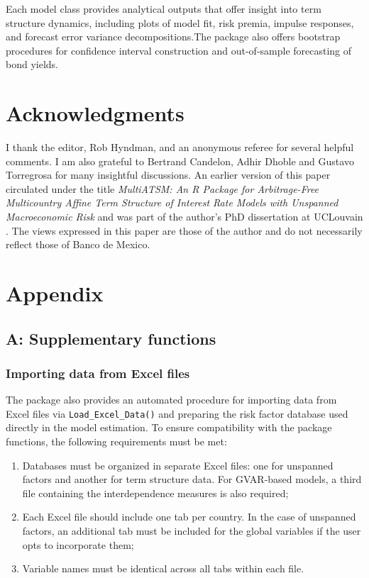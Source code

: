 Each model class provides analytical outputs that offer insight into term structure dynamics, including plots of model fit, risk premia, impulse responses, and forecast error variance decompositions.The  package also offers bootstrap procedures for confidence interval construction and out-of-sample forecasting of bond yields.

\section*{Acknowledgments}\label{acknowledgments}

I thank the editor, Rob Hyndman, and an anonymous referee for several helpful comments. I am also grateful to Bertrand Candelon, Adhir Dhoble and Gustavo Torregrosa for many insightful discussions. An earlier version of this paper circulated under the title \emph{MultiATSM: An R Package for Arbitrage-Free Multicountry Affine Term Structure of Interest Rate Models with Unspanned Macroeconomic Risk} and was part of the author's PhD dissertation at UCLouvain \citep{Moura2022}. The views expressed in this paper are those of the author and do not necessarily reflect those of Banco de Mexico.

\section{Appendix}\label{appendix}

\subsection*{A: Supplementary functions}\label{a-supplementary-functions}

\subsubsection{Importing data from Excel files}\label{importing-data-from-excel-files}

The  package also provides an automated procedure for importing data from Excel files via \texttt{Load\_Excel\_Data()} and preparing the risk factor database used directly in the model estimation. To ensure compatibility with the package functions, the following requirements must be met:

\begin{enumerate}
\def\labelenumi{\arabic{enumi}.}
\tightlist
\item
  Databases must be organized in separate Excel files: one for unspanned factors and another for term structure data. For GVAR-based models, a third file containing the interdependence measures is also required;
\item
  Each Excel file should include one tab per country. In the case of unspanned factors, an additional tab must be included for the global variables if the user opts to incorporate them;
\item
  Variable names must be identical across all tabs within each file.
\end{enumerate}

